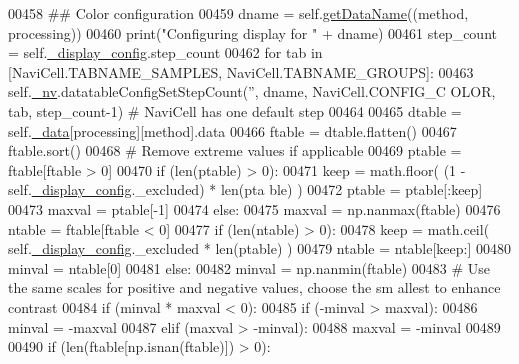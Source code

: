 \begin{DoxyCode}
00458             \textcolor{comment}{## Color configuration}
00459             dname = self.\hyperlink{classnavicom_1_1navicom_1_1NaviCom_a51ecb41beebc7636bde73be2e1ffc407}{getDataName}((method, processing))
00460             \textcolor{keywordflow}{print}(\textcolor{stringliteral}{"Configuring display for "} + dname)
00461             step\_count = self.\hyperlink{classnavicom_1_1navicom_1_1NaviCom_ab8ddca454f674629472d8bfec46ac76f}{_display_config}.step\_count
00462             \textcolor{keywordflow}{for} tab \textcolor{keywordflow}{in} [NaviCell.TABNAME\_SAMPLES, NaviCell.TABNAME\_GROUPS]:
00463                 self.\hyperlink{classnavicom_1_1navicom_1_1NaviCom_afff3fd56fa16a68bab52ba8d801e325a}{_nv}.datatableConfigSetStepCount(\textcolor{stringliteral}{''}, dname, NaviCell.CONFIG\_C
      OLOR, tab, step\_count-1) \textcolor{comment}{# NaviCell has one default step}
00464 
00465             dtable = self.\hyperlink{classnavicom_1_1navicom_1_1NaviCom_a407b2b5c30a5652ee85c4be54b3e6679}{_data}[processing][method].data
00466             ftable = dtable.flatten()
00467             ftable.sort()
00468             \textcolor{comment}{# Remove extreme values if applicable}
00469             ptable = ftable[ftable > 0]
00470             \textcolor{keywordflow}{if} (len(ptable) > 0):
00471                 keep = math.floor( (1 - self.\hyperlink{classnavicom_1_1navicom_1_1NaviCom_ab8ddca454f674629472d8bfec46ac76f}{_display_config}.\_excluded) * len(pta
      ble) )
00472                 ptable = ptable[:keep]
00473                 maxval = ptable[-1]
00474             \textcolor{keywordflow}{else}:
00475                 maxval = np.nanmax(ftable)
00476             ntable = ftable[ftable < 0]
00477             \textcolor{keywordflow}{if} (len(ntable) > 0):
00478                 keep = math.ceil( self.\hyperlink{classnavicom_1_1navicom_1_1NaviCom_ab8ddca454f674629472d8bfec46ac76f}{_display_config}.\_excluded * len(ptable) )
00479                 ntable = ntable[keep:]
00480                 minval = ntable[0]
00481             \textcolor{keywordflow}{else}:
00482                 minval = np.nanmin(ftable)
00483             \textcolor{comment}{# Use the same scales for positive and negative values, choose the sm
      allest to enhance contrast}
00484             \textcolor{keywordflow}{if} (minval * maxval < 0):
00485                 \textcolor{keywordflow}{if} (-minval > maxval):
00486                     minval = -maxval
00487                 \textcolor{keywordflow}{elif} (maxval > -minval):
00488                     maxval = -minval
00489 
00490             \textcolor{keywordflow}{if} (len(ftable[np.isnan(ftable)]) > 0):

\end{DoxyCode}
